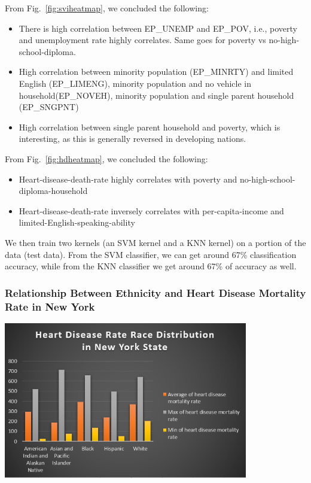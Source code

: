 \documentclass[journal,12pt,onecolumn]{IEEEtran}
\begin{document}
From Fig.~\ref{fig:sviheatmap}, we concluded the following:
\begin{itemize}
\item There is high correlation between EP\_UNEMP and EP\_POV, i.e., poverty and unemployment rate highly correlates. Same goes for poverty vs no-high-school-diploma.
\item High correlation between minority population (EP\_MINRTY) and limited English (EP\_LIMENG), minority population and no vehicle in household(EP\_NOVEH), minority population and single parent household (EP\_SNGPNT)
\item High correlation between single parent household and poverty, which is interesting, as this is generally reversed in developing nations.
\end{itemize}

From Fig.~\ref{fig:hdheatmap}, we concluded the following:
\begin{itemize}
\item Heart-disease-death-rate highly correlates with poverty and no-high-school-diploma-household
\item Heart-disease-death-rate inversely correlates with per-capita-income and limited-English-speaking-ability
\end{itemize}


We then train two kernels (an SVM kernel and a KNN kernel) on a portion of the data (test data).
From the SVM classifier, we can get around 67\% classification accuracy, while from the KNN classifier we get around 67\% of accuracy as well.

\subsubsection{Relationship Between Ethnicity and Heart Disease Mortality Rate in New York}

\begin{center}
\centering
\includegraphics[width=0.8\textwidth]{figures/ethnicity_hd.PNG}
\label{fig:ethnicity_hd}
\end{center}
\end{document}
